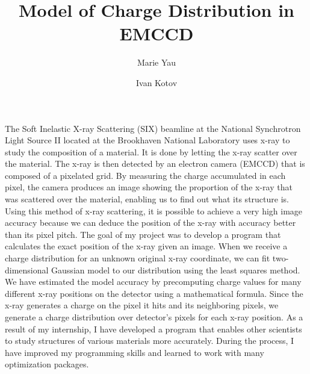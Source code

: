 \documentclass{article}
\title{Model of Charge Distribution in EMCCD}
\author[1]{Marie Yau}
\author[2]{Ivan Kotov}
\affil[1]{University of California, Berkeley}
\affil[2]{Brookhaven National Laboratory}
\date
\begin{document}
\maketitle

The Soft Inelastic X-ray Scattering (SIX) beamline at the National Synchrotron Light Source II located at the Brookhaven National Laboratory uses x-ray to study the composition of a material. It is done by letting the x-ray scatter over the material. The x-ray is then detected by an electron camera (EMCCD) that is composed of a pixelated grid. By measuring the charge accumulated in each pixel, the camera produces an image showing the proportion of the x-ray that was scattered over the material, enabling us to find out what its structure is. Using this method of x-ray scattering, it is possible to achieve a very high image accuracy because we can deduce the position of the x-ray with accuracy better than its pixel pitch. The goal of my project was to develop a program that calculates the exact position of the x-ray given an image. When we receive a charge distribution for an unknown original x-ray coordinate, we can fit two-dimensional Gaussian model to our distribution using the least squares method. We have estimated the model accuracy by precomputing charge values for many different x-ray positions on the detector using a mathematical formula. Since the x-ray generates a charge on the pixel it hits and its neighboring pixels, we generate a charge distribution over detector’s pixels for each x-ray position. As a result of my internship, I have developed a program that enables other scientists to study structures of various materials more accurately. During the process, I have improved my programming skills and learned to work with many optimization packages.
\end{document}
